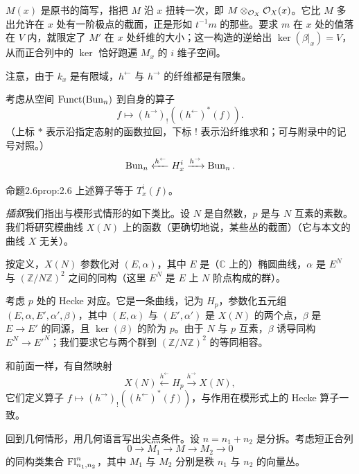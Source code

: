 \begin{annote}
$M(x)$ 是原书的简写，指把 $M$ 沿 $x$ 扭转一次，即 $M\otimes_{\mathcal{O}_X}\mathcal{O}_X(x)$。它比 $M$ 多出允许在 $x$ 处有一阶极点的截面，正是形如 $t^{-1}m$ 的那些。要求 $m$ 在 $x$ 处的值落在 $V$ 内，就限定了 $M'$ 在 $x$ 处纤维的大小；这一构造的逆给出 $\ker(\beta|_x)=V$，从而正合列中的 $\ker$ 恰好跑遍 $M_x$ 的 $i$ 维子空间。\par\vspace{0.15em}{\raggedleft 【来源：原书 \S2.4（A）；$M(x)$ 的常规含义（B）】\par}
\end{annote}

注意，由于 $k_x$ 是有限域，$h^{\leftarrow}$ 与 $h^{\rightarrow}$ 的纤维都是有限集。

考虑从空间 $\operatorname{Funct}(\operatorname{Bun}_n)$ 到自身的算子
\[
f\mapsto(h^{\rightarrow})_!((h^{\leftarrow})^*(f)).
\]
（上标 $*$ 表示沿指定态射的函数拉回，下标 $!$ 表示沿纤维求和；可与附录中的记号对照。）
\[
\operatorname{Bun}_n\xleftarrow{h^{\leftarrow}}H_x^i\xrightarrow{h^{\rightarrow}}\operatorname{Bun}_n.
\]

\begin{othm}{命题}{2.6}{prop:2.6}
上述算子等于 $T_x^i(f)$。
\end{othm}

\emph{插叙}\quad 我们指出与模形式情形的如下类比。设 $N$ 是自然数，$p$ 是与 $N$ 互素的素数。我们将研究模曲线 $X(N)$ 上的函数（更确切地说，某些丛的截面）（它与本文的曲线 $X$ 无关）。

按定义，$X(N)$ 参数化对 $(E,\alpha)$，其中 $E$ 是（$\mathbb{C}$ 上的）椭圆曲线，$\alpha$ 是 $E^N$ 与 $(\mathbb{Z}/N\mathbb{Z})^2$ 之间的同构（这里 $E^N$ 是 $E$ 上 $N$ 阶点构成的群）。

考虑 $p$ 处的 Hecke 对应。它是一条曲线，记为 $H_p$，参数化五元组 $(E,\alpha,E',\alpha',\beta)$，其中 $(E,\alpha)$ 与 $(E',\alpha')$ 是 $X(N)$ 的两个点，$\beta$ 是 $E\to E'$ 的同源，且 $\ker(\beta)$ 的阶为 $p$。由于 $N$ 与 $p$ 互素，$\beta$ 诱导同构 $E^N\to E'^N$；我们要求它与两个群到 $(\mathbb{Z}/N\mathbb{Z})^2$ 的等同相容。

和前面一样，有自然映射
\[
X(N)\xleftarrow{h^{\leftarrow}}H_p\xrightarrow{h^{\rightarrow}}X(N),
\]
它们定义算子 $f\mapsto(h^{\rightarrow})_!((h^{\leftarrow})^*(f))$，与作用在模形式上的 Hecke 算子一致。

回到几何情形，用几何语言写出尖点条件。设 $n=n_1+n_2$ 是分拆。考虑短正合列
\[
0\to M_1\to M\to M_2\to 0
\]
的同构类集合 $\mathrm{Fl}^n_{n_1,n_2}$，其中 $M_1$ 与 $M_2$ 分别是秩 $n_1$ 与 $n_2$ 的向量丛。

